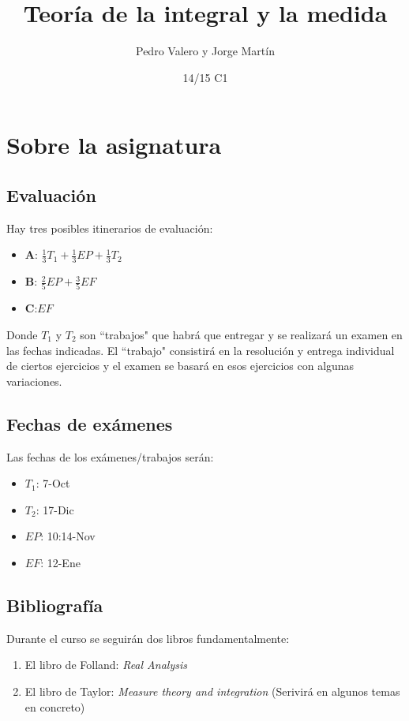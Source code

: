 \documentclass{apuntes}
\title{Teoría de la integral y la medida}
\author{Pedro Valero y Jorge Martín}
\date{14/15 C1}
\begin{document}
\pagestyle{plain}
\maketitle


\tableofcontents
\newpage

\chapter{Sobre la asignatura}
\section{Evaluación}
Hay tres posibles itinerarios de evaluación:
\begin{itemize}
\item \textbf{A}: $\frac{1}{3}T_1+\frac{1}{3}EP+\frac{1}{3}T_2$
\item \textbf{B}: $\frac{2}{5}EP+ \frac{3}{5}EF$
\item \textbf{C}:$EF$
\end{itemize}
Donde $T_1$  y $T_2$ son ``trabajos" que habrá que entregar y se realizará un examen en las fechas indicadas. El ``trabajo" consistirá en la resolución y entrega individual de ciertos ejercicios y el examen se basará en esos ejercicios con algunas variaciones.

\section{Fechas de exámenes}
Las fechas de los exámenes/trabajos serán:
\begin{itemize}
\item $T_1$: 7-Oct
\item $T_2$: 17-Dic
\item $EP$: 10:14-Nov
\item $EF$: 12-Ene
\end{itemize}

\section{Bibliografía}
Durante el curso se seguirán dos libros fundamentalmente:
\begin{enumerate}
\item El libro de Folland: \textit{Real Analysis}
\item El libro de Taylor: \textit{Measure theory and integration} (Serivirá en algunos temas en concreto)
\end{enumerate}
\end{document}
